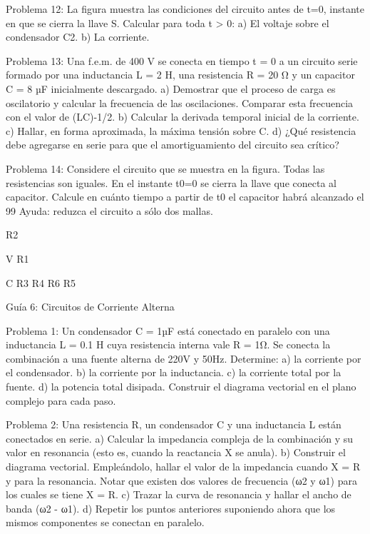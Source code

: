Problema 12:
La figura muestra las condiciones del circuito antes de t=0, instante en que se cierra la llave S. Calcular para toda t > 0:
a)	El voltaje sobre el condensador C2.
b)	La corriente.



Problema 13:
Una f.e.m. de 400 V se conecta en tiempo t = 0 a un circuito serie formado por una inductancia
L = 2 H, una resistencia R = 20 Ω y un capacitor C = 8 µF inicialmente descargado.
a)	Demostrar que el proceso de carga es oscilatorio y calcular la frecuencia de las oscilaciones.
Comparar esta frecuencia con el valor de (LC)-1/2.
b)	Calcular la derivada temporal inicial de la corriente.
c)	Hallar, en forma aproximada, la máxima tensión sobre C.
d)	¿Qué resistencia debe agregarse en serie para que el amortiguamiento del circuito sea crítico?
 


 
Problema 14:
Considere el circuito que se muestra en la figura. Todas las resistencias son iguales. En el instante t0=0 se cierra la llave que conecta al capacitor. Calcule en cuánto tiempo a partir de t0 el capacitor habrá alcanzado el 99%
Ayuda: reduzca el circuito a sólo dos mallas.
 



R2

V	R1

C
R3	R4
R6	R5
 


Guía 6: Circuitos de Corriente Alterna

Problema 1:
Un condensador C = 1µF está conectado en paralelo con una inductancia L = 0.1 H cuya resistencia interna vale R = 1Ω. Se conecta la combinación a una fuente alterna de 220V y 50Hz. Determine:
a)	la corriente por el condensador.
b)	la corriente por la inductancia.
c)	la corriente total por la fuente.
d)	la potencia total disipada.
Construir el diagrama vectorial en el plano complejo para cada paso.



Problema 2:
Una resistencia R, un condensador C y una inductancia L están conectados en serie.
a)	Calcular la impedancia compleja de la combinación y su valor en resonancia (esto es, cuando la reactancia X se anula).
b)	Construir el diagrama vectorial. Empleándolo, hallar el valor de la impedancia cuando X = R y para la resonancia. Notar que existen dos valores de frecuencia (ω2 y ω1) para los cuales se tiene X = R.
c)	Trazar la curva de resonancia y hallar el ancho de banda (ω2 - ω1).
d)	Repetir los puntos anteriores suponiendo ahora que los mismos componentes se conectan
en paralelo.



